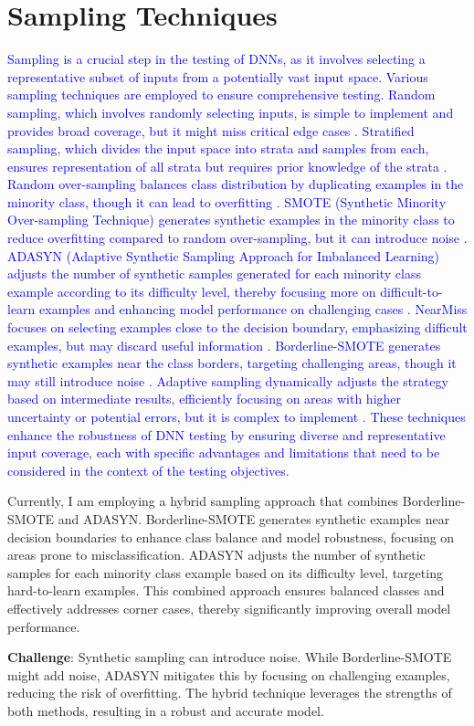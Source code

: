 \section{Sampling Techniques}
\textcolor{blue}{
Sampling is a crucial step in the testing of DNNs, as it involves selecting a representative subset of inputs from a potentially vast input space. Various sampling techniques are employed to ensure comprehensive testing. Random sampling, which involves randomly selecting inputs, is simple to implement and provides broad coverage, but it might miss critical edge cases \cite{Frey1997}. Stratified sampling, which divides the input space into strata and samples from each, ensures representation of all strata but requires prior knowledge of the strata \cite{Katz2017}. Random over-sampling balances class distribution by duplicating examples in the minority class, though it can lead to overfitting \cite{Chawla2002}. SMOTE (Synthetic Minority Over-sampling Technique) generates synthetic examples in the minority class to reduce overfitting compared to random over-sampling, but it can introduce noise \cite{Chawla2002}. ADASYN (Adaptive Synthetic Sampling Approach for Imbalanced Learning) adjusts the number of synthetic samples generated for each minority class example according to its difficulty level, thereby focusing more on difficult-to-learn examples and enhancing model performance on challenging cases \cite{He2008}. NearMiss focuses on selecting examples close to the decision boundary, emphasizing difficult examples, but may discard useful information \cite{Mani2003}. Borderline-SMOTE generates synthetic examples near the class borders, targeting challenging areas, though it may still introduce noise \cite{Han2005}. Adaptive sampling dynamically adjusts the strategy based on intermediate results, efficiently focusing on areas with higher uncertainty or potential errors, but it is complex to implement \cite{Roth2019}. These techniques enhance the robustness of DNN testing by ensuring diverse and representative input coverage, each with specific advantages and limitations that need to be considered in the context of the testing objectives.
}
\begin{tcolorbox}[colback=purple!2!white, colframe=purple]

  Currently, I am employing a hybrid sampling approach that combines Borderline-SMOTE and ADASYN. Borderline-SMOTE generates synthetic examples near decision boundaries to enhance class balance and model robustness, focusing on areas prone to misclassification. ADASYN adjusts the number of synthetic samples for each minority class example based on its difficulty level, targeting hard-to-learn examples. This combined approach ensures balanced classes and effectively addresses corner cases, thereby significantly improving overall model performance.
  
  \textbf{Challenge}: Synthetic sampling can introduce noise. While Borderline-SMOTE might add noise, ADASYN mitigates this by focusing on challenging examples, reducing the risk of overfitting. The hybrid technique leverages the strengths of both methods, resulting in a robust and accurate model.
  
  \end{tcolorbox}
